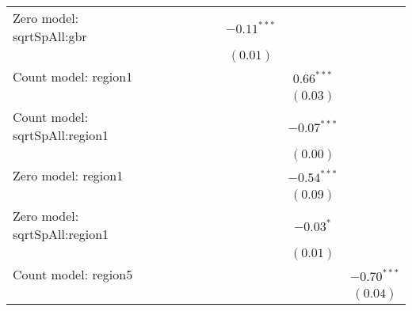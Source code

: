 \begin{sidewaystable}
\begin{center}
{\begin{tabular}{l c c c c c c c c c}
Zero model: sqrtSpAll:gbr      &                &               &               &               &               &                & $-0.11^{***}$ &                &               \\
                               &                &               &               &               &               &                & $(0.01)$      &                &               \\
Count model: region1           &                &               &               &               &               &                &               & $0.66^{***}$   &               \\
                               &                &               &               &               &               &                &               & $(0.03)$       &               \\
Count model: sqrtSpAll:region1 &                &               &               &               &               &                &               & $-0.07^{***}$  &               \\
                               &                &               &               &               &               &                &               & $(0.00)$       &               \\
Zero model: region1            &                &               &               &               &               &                &               & $-0.54^{***}$  &               \\
                               &                &               &               &               &               &                &               & $(0.09)$       &               \\
Zero model: sqrtSpAll:region1  &                &               &               &               &               &                &               & $-0.03^{*}$    &               \\
                               &                &               &               &               &               &                &               & $(0.01)$       &               \\
Count model: region5           &                &               &               &               &               &                &               &                & $-0.70^{***}$ \\
                               &                &               &               &               &               &                &               &                & $(0.04)$      \\

\end{tabular}}
\end{center}
\end{sidewaystable}
